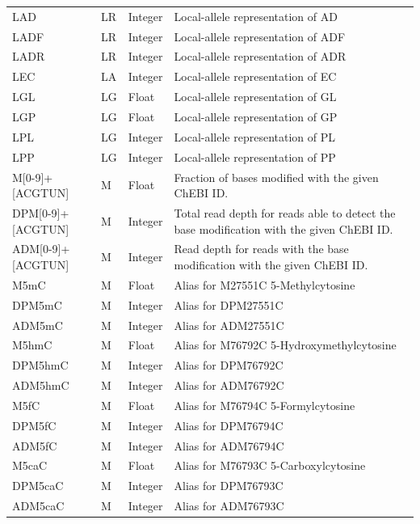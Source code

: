 \documentclass[8pt]{article}
\begin{document}
\begin{longtable}[c]{ | p{2.5cm} | p{1.5cm} | p{1.5cm} | p{10.3cm} | }
      LAD		& LR    	& Integer	& Local-allele representation of AD \\
      LADF		& LR    	& Integer	& Local-allele representation of ADF \\
      LADR		& LR    	& Integer	& Local-allele representation of ADR \\
      LEC		& LA     	& Integer	& Local-allele representation of EC \\
      LGL		& LG    	& Float		& Local-allele representation of GL \\
      LGP		& LG    	& Float		& Local-allele representation of GP \\
      LPL		& LG    	& Integer	& Local-allele representation of PL \\
      LPP		& LG    	& Integer	& Local-allele representation of PP \\
      M[0-9]+[ACGTUN]   & M & Float     & Fraction of bases modified with the given ChEBI ID. \\
      DPM[0-9]+[ACGTUN]	& M & Integer   & Total read depth for reads able to detect the base modification with the given ChEBI ID. \\
      ADM[0-9]+[ACGTUN]	& M & Integer   & Read depth for reads with the base modification with the given ChEBI ID. \\
      M5mC   	& M         & Float     & Alias for M27551C 5-Methylcytosine \\
      DPM5mC   	& M         & Integer   & Alias for DPM27551C \\
      ADM5mC   	& M         & Integer   & Alias for ADM27551C \\
      M5hmC   	& M         & Float     & Alias for M76792C 5-Hydroxymethylcytosine \\
      DPM5hmC   & M         & Integer   & Alias for DPM76792C \\
      ADM5hmC   & M         & Integer   & Alias for ADM76792C \\
      M5fC   	& M         & Float     & Alias for M76794C 5-Formylcytosine \\
      DPM5fC   	& M         & Integer   & Alias for DPM76794C \\
      ADM5fC   	& M         & Integer   & Alias for ADM76794C \\
      M5caC   	& M         & Float     & Alias for M76793C 5-Carboxylcytosine \\
      DPM5caC   & M         & Integer   & Alias for DPM76793C \\
      ADM5caC   & M         & Integer   & Alias for ADM76793C \\

\end{longtable}
\end{document}
